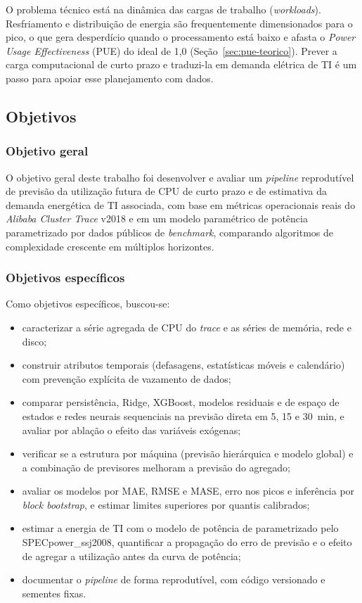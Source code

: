 \documentclass[a4paper,12pt]{article}
\begin{document}
O problema técnico está na dinâmica das cargas de trabalho (\textit{workloads}). Resfriamento e distribuição de energia são frequentemente dimensionados para o pico, o que gera desperdício quando o processamento está baixo e afasta o \textit{Power Usage Effectiveness} (PUE) do ideal de 1,0 (Seção~\ref{sec:pue-teorico}). Prever a carga computacional de curto prazo e traduzi-la em demanda elétrica de TI é um passo para apoiar esse planejamento com dados.

\subsection{Objetivos}

\subsubsection{Objetivo geral}

O objetivo geral deste trabalho foi desenvolver e avaliar um \textit{pipeline} reprodutível de previsão da utilização futura de CPU de curto prazo e de estimativa da demanda energética de TI associada, com base em métricas operacionais reais do \textit{Alibaba Cluster Trace} v2018 e em um modelo paramétrico de potência parametrizado por dados públicos de \textit{benchmark}, comparando algoritmos de complexidade crescente em múltiplos horizontes.

\subsubsection{Objetivos específicos}

Como objetivos específicos, buscou-se:

\begin{itemize}
    \item caracterizar a série agregada de CPU do \textit{trace} e as séries de memória, rede e disco;
    \item construir atributos temporais (defasagens, estatísticas móveis e calendário) com prevenção explícita de vazamento de dados;
    \item comparar persistência, Ridge, XGBoost, modelos residuais e de espaço de estados e redes neurais sequenciais na previsão direta em 5, 15 e 30~min, e avaliar por ablação o efeito das variáveis exógenas;
    \item verificar se a estrutura por máquina (previsão hierárquica e modelo global) e a combinação de previsores melhoram a previsão do agregado;
    \item avaliar os modelos por MAE, RMSE e MASE, erro nos picos e inferência por \textit{block bootstrap}, e estimar limites superiores por quantis calibrados;
    \item estimar a energia de TI com o modelo de potência de  parametrizado pelo SPECpower\_ssj2008, quantificar a propagação do erro de previsão e o efeito de agregar a utilização antes da curva de potência;
    \item documentar o \textit{pipeline} de forma reprodutível, com código versionado e sementes fixas.
\end{itemize}
\end{document}
